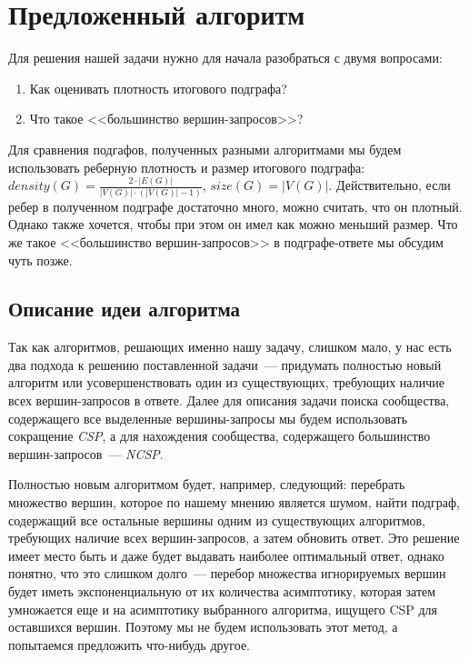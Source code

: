 \chapter{Предложенный алгоритм}

Для решения нашей задачи нужно для начала разобраться с двумя вопросами:

\begin{enumerate}
  \item Как оценивать плотность итогового подграфа?
  \item Что такое <<большинство вершин-запросов>>?
\end{enumerate}

Для сравнения подгафов, полученных разными алгоритмами мы будем использовать реберную плотность и размер итогового подграфа: $density(G) = \frac{2 \cdot |E(G)|}{|V(G)| \cdot (|V(G)| - 1)}$, $size(G) = |V(G)|$. Действительно, если ребер в полученном подграфе достаточно много, можно считать, что он плотный. Однако также хочется, чтобы при этом он имел как можно меньший размер. Что же такое <<большинство вершин-запросов>> в подграфе-ответе мы обсудим чуть позже.

\section{Описание идеи алгоритма}

Так как алгоритмов, решающих именно нашу задачу, слишком мало, у нас есть два подхода к решению поставленной задачи~--- придумать полностью новый алгоритм или усовершенствовать один из существующих, требующих наличие всех вершин-запросов в ответе. Далее для описания задачи поиска сообщества, содержащего все выделенные вершины-запросы мы будем использовать сокращение \textit{CSP}, а для нахождения сообщества, содержащего большинство вершин-запросов~--- \textit{NCSP}.

Полностью новым алгоритмом будет, например, следующий: перебрать множество вершин, которое по нашему мнению является шумом, найти подграф, содержащий все остальные вершины одним из существующих алгоритмов, требующих наличие всех вершин-запросов, а затем обновить ответ. Это решение имеет место быть и даже будет выдавать наиболее оптимальный ответ, однако понятно, что это слишком долго~--- перебор множества игнорируемых вершин будет иметь экспоненциальную от их количества асимптотику, которая затем умножается еще и на асимптотику выбранного алгоритма, ищущего CSP для оставшихся вершин. Поэтому мы не будем использовать этот метод, а попытаемся предложить что-нибудь другое.

